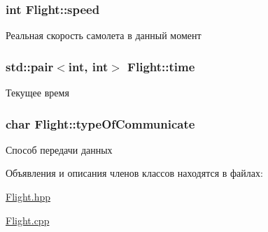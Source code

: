 \subsubsection[{\texorpdfstring{speed}{speed}}]{\setlength{\rightskip}{0pt plus 5cm}int Flight\+::speed\hspace{0.3cm}{\ttfamily [private]}}\hypertarget{class_flight_a65b5d5c131af956b5917873f13e46482}{}\label{class_flight_a65b5d5c131af956b5917873f13e46482}
Реальная скорость самолета в данный момент 
\subsubsection[{\texorpdfstring{time}{time}}]{\setlength{\rightskip}{0pt plus 5cm}std\+::pair$<$int, int$>$ Flight\+::time\hspace{0.3cm}{\ttfamily [private]}}\hypertarget{class_flight_aee68d4d120582ca40f099b98401226ca}{}\label{class_flight_aee68d4d120582ca40f099b98401226ca}
Текущее время 
\subsubsection[{\texorpdfstring{type\+Of\+Communicate}{typeOfCommunicate}}]{\setlength{\rightskip}{0pt plus 5cm}char Flight\+::type\+Of\+Communicate\hspace{0.3cm}{\ttfamily [private]}}\hypertarget{class_flight_a341b420c6d94c008843d766568b741db}{}\label{class_flight_a341b420c6d94c008843d766568b741db}
Способ передачи данных 

Объявления и описания членов классов находятся в файлах\+:\begin{DoxyCompactItemize}
\item 
\hyperlink{_flight_8hpp}{Flight.\+hpp}\item 
\hyperlink{_flight_8cpp}{Flight.\+cpp}\end{DoxyCompactItemize}
